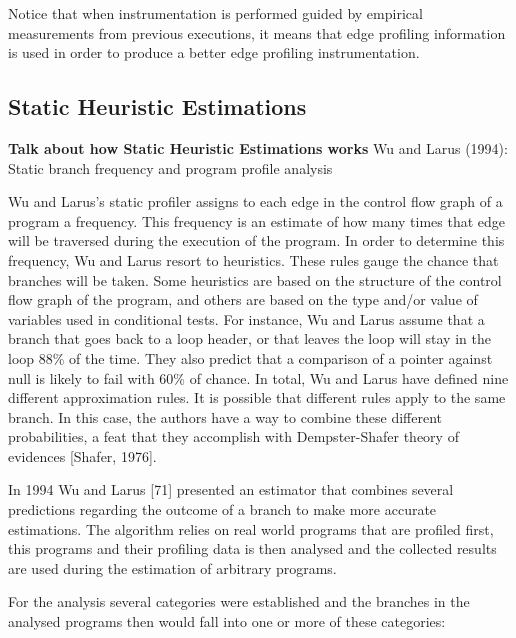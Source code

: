 Notice that when instrumentation is performed guided by empirical measurements from previous executions, it means that edge profiling information is used in order to produce a better edge profiling instrumentation.


\subsection{Static Heuristic Estimations}

\textbf{Talk about how Static Heuristic Estimations works}
\citep{forman81,ball94}
Wu and Larus (1994): Static branch frequency and program profile analysis

Wu and Larus's static profiler assigns to each edge in the control flow graph
of a program a frequency. This frequency is an estimate of how many times that
edge will be traversed during the execution of the program. In order to determine
this frequency, Wu and Larus resort to heuristics. These rules gauge the chance that
branches will be taken. Some heuristics are based on the structure of the control flow
graph of the program, and others are based on the type and/or value of variables used
in conditional tests. For instance, Wu and Larus assume that a branch that goes back
to a loop header, or that leaves the loop will stay in the loop 88\% of the time. They
also predict that a comparison of a pointer against null is likely to fail with 60\% of
chance. In total, Wu and Larus have defined nine different approximation rules. It
is possible that different rules apply to the same branch. In this case, the authors
have a way to combine these different probabilities, a feat that they accomplish with
Dempster-Shafer theory of evidences [Shafer, 1976].

In 1994 Wu and Larus [71] presented an estimator that combines several predictions
regarding the outcome of a branch to make more accurate estimations.
The algorithm relies on real world programs that are profiled first, this programs
and their profiling data is then analysed and the collected results are
used during the estimation of arbitrary programs.

For the analysis several categories were established and the branches in the
analysed programs then would fall into one or more of these categories:

